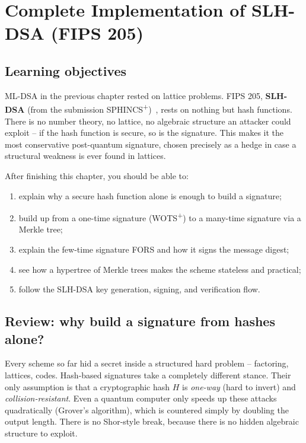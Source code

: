 \chapter{Complete Implementation of SLH-DSA (FIPS 205)}

\section{Learning objectives}

ML-DSA in the previous chapter rested on lattice problems. FIPS 205, \textbf{SLH-DSA} (from the submission SPHINCS\textsuperscript{+})~\cite{fips205,sphincsplus2019}, rests on nothing but hash functions. There is no number theory, no lattice, no algebraic structure an attacker could exploit -- if the hash function is secure, so is the signature. This makes it the most conservative post-quantum signature, chosen precisely as a hedge in case a structural weakness is ever found in lattices.

After finishing this chapter, you should be able to:

\begin{enumerate}
  \item explain why a secure hash function alone is enough to build a signature;
  \item build up from a one-time signature (WOTS\textsuperscript{+}) to a many-time signature via a Merkle tree;
  \item explain the few-time signature FORS and how it signs the message digest;
  \item see how a hypertree of Merkle trees makes the scheme stateless and practical;
  \item follow the SLH-DSA key generation, signing, and verification flow.
\end{enumerate}

\section{Review: why build a signature from hashes alone?}

Every scheme so far hid a secret inside a structured hard problem -- factoring, lattices, codes. Hash-based signatures take a completely different stance. Their only assumption is that a cryptographic hash $H$ is \emph{one-way} (hard to invert) and \emph{collision-resistant}. Even a quantum computer only speeds up these attacks quadratically (Grover's algorithm), which is countered simply by doubling the output length. There is no Shor-style break, because there is no hidden algebraic structure to exploit.

